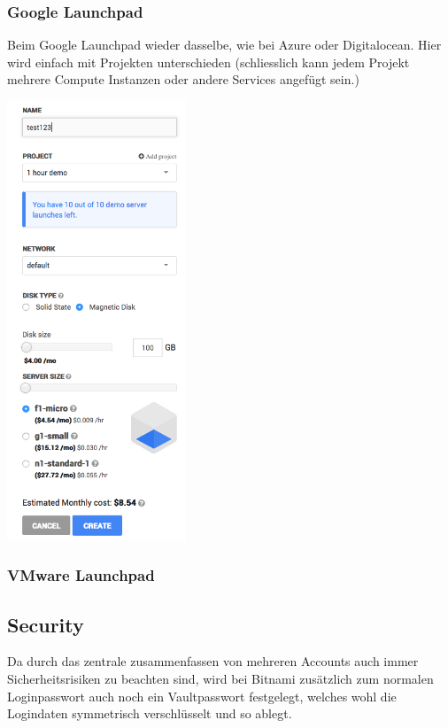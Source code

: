 \documentclass[11pt]{scrartcl}
\begin{document}
\subsubsection{Google Launchpad}

Beim Google Launchpad wieder dasselbe, wie bei Azure oder Digitalocean.
Hier wird einfach mit Projekten unterschieden (schliesslich kann jedem Projekt mehrere Compute Instanzen 
oder andere Services angefügt sein.)


\includegraphics[width=0.4\textwidth]{google_instancereation}


\subsubsection{VMware Launchpad}

\subsection{Security}
Da durch das zentrale zusammenfassen von mehreren Accounts auch immer 
Sicherheitsrisiken zu beachten sind, wird bei Bitnami zusätzlich zum normalen 
Loginpasswort auch noch ein Vaultpasswort festgelegt, welches wohl die 
Logindaten symmetrisch verschlüsselt und so ablegt.
\end{document}
